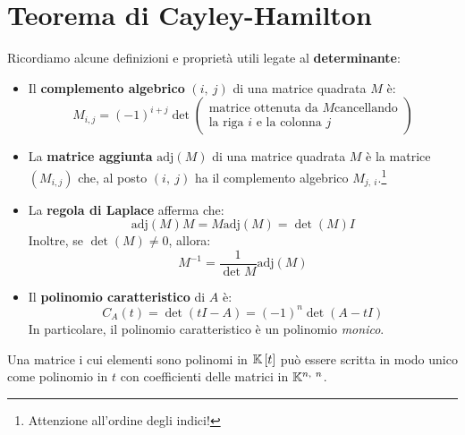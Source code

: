 \section{Teorema di Cayley-Hamilton}
\begin{remember}
	Ricordiamo alcune definizioni e proprietà utili legate al \textbf{determinante}:
	\begin{itemize}
		\item Il \textbf{complemento algebrico} $\left(i,\ j\right)$ di una matrice quadrata $M$ è:
		\begin{equation}
			M_{i,j}=\left(-1\right)^{i+j}\det\left(\begin{array}{c}
				\text{matrice ottenuta da }M\text{cancellando}\\
				\text{la riga }i\text{ e la colonna }j
			\end{array}\right)
		\end{equation}
	\item La \textbf{matrice aggiunta} $\mathrm{adj}\left(M\right)$ di una matrice quadrata $M$ è la matrice $\left(M_{i,j}\right)$ che, al posto $\left(i,\ j\right)$ ha il complemento algebrico $M_{j,\ i}$.\footnote{Attenzione all'ordine degli indici!}
	\item La \textbf{regola di Laplace} afferma che:
	\begin{equation}
		\mathrm{adj}\left(M\right)M=M\mathrm{adj}\left(M\right)=\det\left(M\right)I
	\end{equation}
	Inoltre, se $\det\left(M\right)\neq 0$, allora:
	\begin{equation}
		M^{-1}=\frac{1}{\det M}\mathrm{adj}\left(M\right)
	\end{equation}
\item Il \textbf{polinomio caratteristico} di $A$ è:
\begin{equation}
	C_A\left(t\right)=\det\left(tI-A\right)=\left(-1\right)^n\det\left(A-tI\right)
\end{equation}
In particolare, il polinomio caratteristico è un polinomio \textit{monico}.
	\end{itemize}
\vspace{-3mm}
\end{remember}
\begin{observe}\label{polinomicoeffmatrisci}
Una matrice i cui elementi sono polinomi in $\mathbb{K}\left[t\right]$ può essere scritta in modo unico come polinomio in $t$ con coefficienti delle matrici in $\kamp^{n,\ n}$.
\end{observe}
